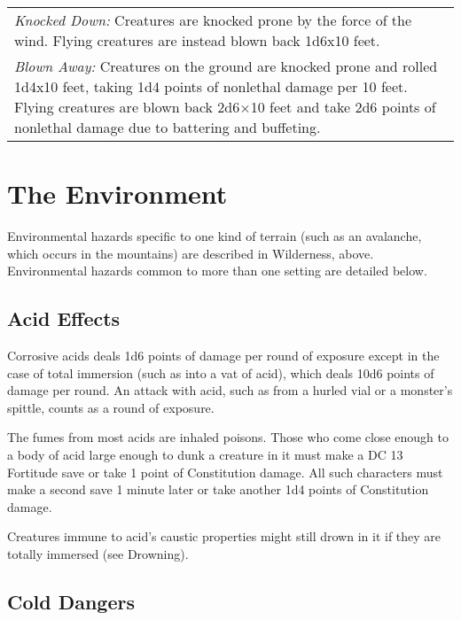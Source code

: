 \begin{table}[htb]
\begin{tabular}{l l l l l c}
\multicolumn{6}{p{16cm}}{\textit{Knocked Down:}\index{Knocked Down} Creatures are knocked prone by the force of the wind. Flying creatures are instead blown back 1d6x10 feet.}\\
\multicolumn{6}{p{16cm}}{\textit{Blown Away:} Creatures on the ground are knocked prone and rolled 1d4x10 feet, taking 1d4 points of nonlethal damage per 10 feet. Flying creatures are blown back 2d6×10 feet and take 2d6 points of nonlethal damage due to battering and buffeting.}\\
\end{tabular}
\end{table}

\section{The Environment}

Environmental hazards specific to one kind of terrain (such as an avalanche, which 
occurs in the mountains) are described in Wilderness, above. Environmental hazards 
common to more than one setting are detailed below.

\subsection{Acid Effects}

Corrosive acids deals 1d6 points of damage per round of exposure except in the 
case of total immersion (such as into a vat of acid), which deals 10d6 points of 
damage per round. An attack with acid, such as from a hurled vial or a monster's 
spittle, counts as a round of exposure.

The fumes from most acids are inhaled poisons. Those who come close enough to a 
body of acid large enough to dunk a creature in it must make a DC 13 Fortitude save or 
take 1 point of Constitution damage. All such characters must make a second save 
1 minute later or take another 1d4 points of Constitution damage.

Creatures immune to acid's caustic properties might still drown in it if they are 
totally immersed (see Drowning).

\subsection{Cold Dangers}

